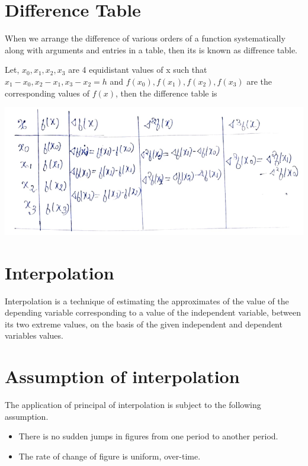 \documentclass{article}
\begin{document}
            
            \section{Difference Table}
              When we arrange the difference of various orders of a function systematically 
              along with arguments and entries in a table, then its is known as diffrence table.
              
              Let, $x_0,x_1,x_2,x_3$ are 4 equidistant values of x such that $x_1-x_0,x_2-x_1,x_3-x_2=h$
              and $f(x_0),f(x_1),f(x_2),f(x_3)$ are the corresponding values of $f(x)$,
              then the difference table is
              
              \includegraphics[scale=0.65]{difference table}
            
            
            \section{Interpolation}
              Interpolation is a technique of estimating the approximates of the value 
              of the depending variable corresponding to a value of the independent variable, 
              between its two extreme values, on the basis of the given independent and 
              dependent variables values.
            
            \section{Assumption of interpolation}
              The application of principal of interpolation is subject to the following assumption.
              \begin{itemize}
                \item There is no sudden jumps in figures from one period to another period.
                  
                \item The rate of change of figure is uniform, over-time.
              
              \end{itemize}
\end{document}
